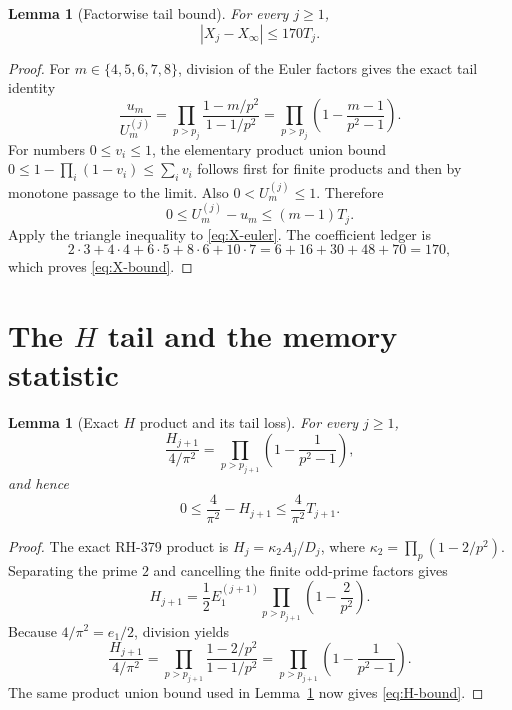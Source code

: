 \documentclass[11pt]{article}
\newtheorem{lemma}[theorem]{Lemma}
\theoremstyle{definition}
\theoremstyle{remark}
\newcommand{\kap}{\kappa_2}
\begin{document}
\begin{lemma}[Factorwise tail bound]
\label{lem:X-bound}
For every $j\ge1$,
\begin{equation}
                 \boxed{|X_j-X_\infty|\le170T_j.}
 \label{eq:X-bound}
\end{equation}
\end{lemma}

\begin{proof}
For $m\in\{4,5,6,7,8\}$, division of the Euler factors gives the exact
tail identity
\begin{equation}
 \frac{u_m}{U_m^{(j)}}
 =\prod_{p>p_j}\frac{1-m/p^2}{1-1/p^2}
 =\prod_{p>p_j}\left(1-\frac{m-1}{p^2-1}\right).
 \label{eq:ratio-tail}
\end{equation}
For numbers $0\le v_i\le1$, the elementary product union bound
$0\le1-\prod_i(1-v_i)\le\sum_i v_i$ follows first for finite products and
then by monotone passage to the limit.  Also $0<U_m^{(j)}\le1$.  Therefore
\begin{equation}
 0\le U_m^{(j)}-u_m
 \le (m-1)T_j.
 \label{eq:one-ratio-bound}
\end{equation}
Apply the triangle inequality to \eqref{eq:X-euler}.  The coefficient
ledger is
\[
 2\cdot3+4\cdot4+6\cdot5+8\cdot6+10\cdot7
 =6+16+30+48+70=170,
\]
which proves \eqref{eq:X-bound}.
\end{proof}

\section{The \texorpdfstring{$H$}{H} tail and the memory statistic}

\begin{lemma}[Exact $H$ product and its tail loss]
\label{lem:H-tail}
For every $j\ge1$,
\begin{equation}
 \frac{H_{j+1}}{4/\pi^2}
 =\prod_{p>p_{j+1}}\left(1-\frac1{p^2-1}\right),
 \label{eq:H-product}
\end{equation}
and hence
\begin{equation}
 0\le\frac4{\pi^2}-H_{j+1}
 \le\frac4{\pi^2}T_{j+1}.
 \label{eq:H-bound}
\end{equation}
\end{lemma}

\begin{proof}
The exact RH-379 product is $H_j=\kap A_j/D_j$, where
$\kap=\prod_p(1-2/p^2)$.  Separating the prime $2$ and cancelling the
finite odd-prime factors gives
\[
 H_{j+1}=\frac12 E_1^{(j+1)}
 \prod_{p>p_{j+1}}\left(1-\frac2{p^2}\right).
\]
Because $4/\pi^2=e_1/2$, division yields
\[
 \frac{H_{j+1}}{4/\pi^2}
 =\prod_{p>p_{j+1}}
 \frac{1-2/p^2}{1-1/p^2}
 =\prod_{p>p_{j+1}}\left(1-\frac1{p^2-1}\right).
\]
The same product union bound used in Lemma~\ref{lem:X-bound} now gives
\eqref{eq:H-bound}.
\end{proof}
\end{document}
